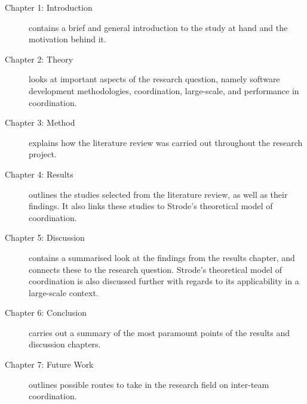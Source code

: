 \begin{description}
    \item[Chapter 1: Introduction] contains a brief and general introduction to the study at hand and the motivation behind it.
    \item[Chapter 2: Theory] looks at important aspects of the research question, namely software development methodologies, coordination, large-scale, and performance in coordination.
    \item[Chapter 3: Method] explains how the literature review was carried out throughout the research project.
    \item[Chapter 4: Results] outlines the studies selected from the literature review, as well as their findings. It also links these studies to Strode's theoretical model of coordination.
    \item[Chapter 5: Discussion] contains a summarised look at the findings from the results chapter, and connects these to the research question. Strode's theoretical model of coordination is also discussed further with regards to its applicability in a large-scale context.
    \item[Chapter 6: Conclusion] carries out a summary of the most paramount points of the results and discussion chapters.
    \item[Chapter 7: Future Work] outlines possible routes to take in the research field on inter-team coordination.
\end{description}
